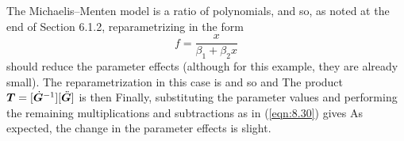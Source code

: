 \begin{example}\label{mic:repar}

The Michaelis--Menten model is a ratio of polynomials, and so, as noted
at the end of Section 6.1.2, reparametrizing in the form
\begin{displaymath}
  f=\frac{x}{\beta_1+\beta_2 x}
\end{displaymath}
should reduce the parameter effects (although for this example, they are
already small).
The reparametrization in this case is
and so
and
The product ${\boldsymbol T} = [ \dot {{\boldsymbol G}}^{-1} ] [ \ddot {{\boldsymbol G}} ]$ is then
Finally, substituting the parameter values and
performing the remaining multiplications and subtractions as in
(\ref{eqn:8.30}) gives
As expected, the change in the parameter effects is slight.
\end{example}

